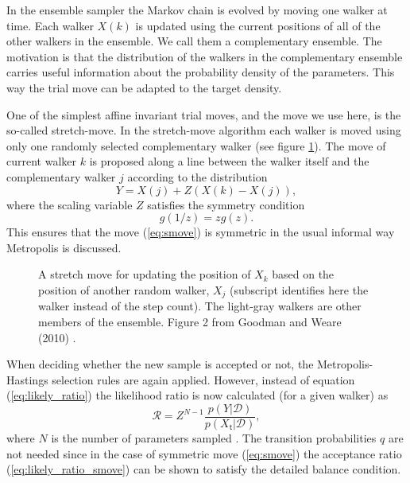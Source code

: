\documentclass{wihuri}
\def\be{\begin{equation}}
\def\ee{\end{equation}}
\def\tstep{\mathsf{t}}
\def\lratio{\mathcal{R}}
\begin{document}
In the ensemble sampler the  Markov chain is evolved by moving one walker at time. Each walker $X(k)$ is updated using the current positions of all of the other walkers in
the ensemble. We call them a complementary ensemble. The motivation is that the distribution of the walkers in the complementary ensemble carries useful information about the probability density of the parameters. This way the trial move can be adapted to the target density.  





One of the simplest affine invariant trial moves, and the move we use here, is the so-called stretch-move. In the stretch-move algorithm each walker is moved using only one randomly selected complementary walker (see figure \ref{fig:smove}). The move of current walker $k$ is proposed along a line between the walker itself and the complementary walker $j$ according to the distribution \cite{emceehammer}
\be \label{eq:smove}
Y = X(j) + Z(X(k)-X(j)),
\ee
where the scaling variable $Z$ satisfies the symmetry condition
\be \label{eq:symmetry_condition}
g(1/z) = zg(z).
\ee
This ensures that the move (\ref{eq:smove}) is symmetric in the usual informal way Metropolis is discussed.%


\begin{figure}
\centerline{}
\caption{A stretch move for updating the position of $X_{k}$ based on the position of another random walker, $X_{j}$ (subscript identifies here the walker instead of the step count). The light-gray walkers are other members of the ensemble. Figure 2 from Goodman and Weare (2010) \cite{ensemble1}.
\label{fig:smove}}
\end{figure}


When deciding whether the new sample is accepted or not, the Metropolis-Hastings selection rules are again applied. However, instead of equation (\ref{eq:likely_ratio}) the likelihood ratio is now calculated (for a given walker) as
\be \label{eq:likely_ratio_smove} 
\lratio = Z^{N-1}\frac{p(Y|\mathcal{D})}{p(X_{\tstep}|\mathcal{D})},
\ee
where $N$ is the number of parameters sampled \cite{emceehammer}. The transition probabilities $q$ are not needed since in the case of symmetric move (\ref{eq:smove}) the acceptance ratio (\ref{eq:likely_ratio_smove}) can be shown to satisfy the detailed balance condition. 
\end{document}
